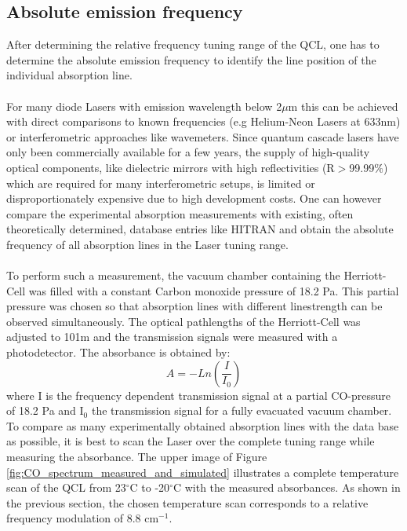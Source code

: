 \subsection{Absolute emission frequency}
After determining the relative frequency tuning range of the QCL, one has to determine the absolute emission frequency to identify the line position of the individual absorption line. \\\\
\noindent
For many diode Lasers with emission wavelength below 2$\mu$m this can be achieved with direct comparisons to known frequencies (e.g Helium-Neon Lasers at 633nm) or interferometric approaches like wavemeters. Since quantum cascade lasers have only been commercially available for a few years, the supply of high-quality optical components, like dielectric mirrors with high reflectivities (R$>$99.99$\%$) which are required for many interferometric setups, is limited or disproportionately expensive due to high development costs. One can however compare the experimental absorption measurements with existing, often theoretically determined, database entries like HITRAN and obtain the absolute frequency of all absorption lines in the Laser tuning range. \\\\
\noindent
To perform such a measurement, the vacuum chamber containing the Herriott-Cell was filled with a constant Carbon monoxide pressure of 18.2 Pa. This partial pressure was chosen so that absorption lines with different linestrength can be observed simultaneously. The optical pathlengths of the Herriott-Cell was adjusted to 101m and the transmission signals were measured with a photodetector. The absorbance is obtained by:
\begin{equation}
	A=-Ln(\frac{I}{I_0})
\end{equation}
where I is the frequency dependent transmission signal at a partial CO-pressure of 18.2 Pa and I$_0$ the transmission signal for a fully evacuated vacuum chamber. To compare as many experimentally obtained absorption lines with the data base as possible, it is best to scan the Laser over the complete tuning range while measuring the absorbance. The upper image of Figure \ref{fig:CO_spectrum_measured_and_simulated} illustrates a complete temperature scan of the QCL from 23$^{\circ}$C to -20$^{\circ}$C with the measured absorbances. As shown in the previous section, the chosen temperature scan corresponds to a relative frequency modulation of 8.8 cm$^{-1}$. \\\\

